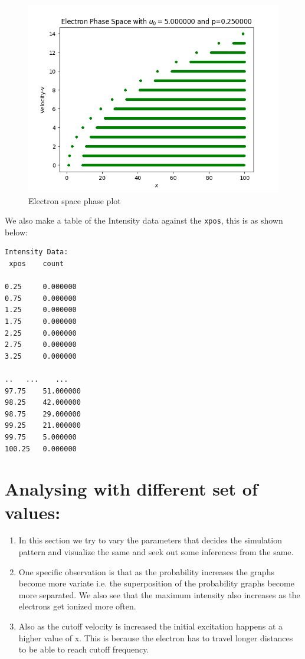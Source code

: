 \documentclass[11pt, a4paper]{article}
\begin{document}
\begin{figure}[!tbh]
\centering
\includegraphics[scale=0.56]{elec_phasa_space.png} 
\caption{Electron space phase plot}
\label{fig:fig_3}
\end{figure} 

We also make a table of the Intensity data against the \texttt{xpos}, this is as shown below:
\begin{verbatim}	
Intensity Data: 
 xpos 	 count 
 
0.25 	 0.000000
0.75 	 0.000000
1.25 	 0.000000
1.75 	 0.000000
2.25 	 0.000000
2.75 	 0.000000
3.25 	 0.000000

..   ...    ...
97.75 	 51.000000
98.25 	 42.000000
98.75 	 29.000000
99.25 	 21.000000
99.75 	 5.000000
100.25 	 0.000000

\end{verbatim}

\section{Analysing with different set of values:}
\begin{enumerate}
    \item In this section we try to vary the parameters that decides the simulation pattern and visualize the same and seek out some inferences from the same.
    \item One specific observation is that as the probability increases the graphs become more variate i.e. the superposition of the probability graphs become more separated. We also see that the maximum intensity also increases as the electrons get ionized more often.
    \item Also as the cutoff velocity is increased the initial excitation happens at a higher value of x. This is because the electron has to travel longer distances to be able to reach cutoff frequency.
\end{enumerate}
\end{document}
